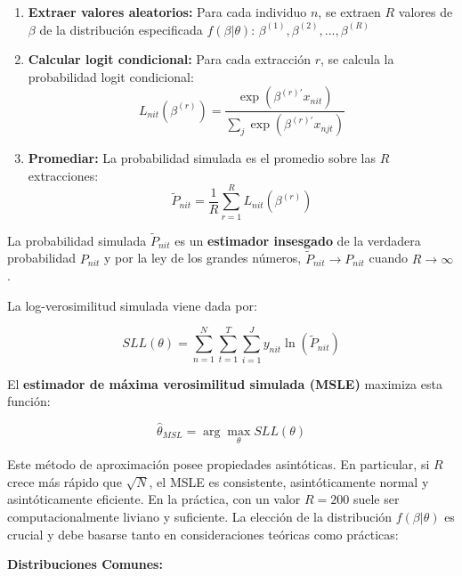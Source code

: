 \documentclass[
]{book}
\begin{document}
\begin{enumerate}
\def\labelenumi{\arabic{enumi}.}
\item
  \textbf{Extraer valores aleatorios:} Para cada individuo \(n\), se extraen \(R\) valores de \(\beta\) de la distribución especificada \(f(\beta|\theta)\): \(\beta^{(1)}, \beta^{(2)}, ..., \beta^{(R)}\)
\item
  \textbf{Calcular logit condicional:} Para cada extracción \(r\), se calcula la probabilidad logit condicional:
  \[L_{nit}(\beta^{(r)}) = \frac{\exp(\beta^{(r)'} x_{nit})}{\sum_j \exp(\beta^{(r)'} x_{njt})}\]
\item
  \textbf{Promediar:} La probabilidad simulada es el promedio sobre las \(R\) extracciones:
  \begin{equation}
  \tilde{P}_{nit} = \frac{1}{R} \sum_{r=1}^R L_{nit}(\beta^{(r)})
  \label{eq:simprob}
  \end{equation}
\end{enumerate}

La probabilidad simulada \(\tilde{P}_{nit}\) es un \textbf{estimador insesgado} de la verdadera probabilidad \(P_{nit}\) y por la ley de los grandes números, \(\tilde{P}_{nit} \to P_{nit}\) cuando \(R \to \infty\).

La log-verosimilitud simulada viene dada por:

\begin{equation}
SLL(\theta) = \sum_{n=1}^N \sum_{t=1}^T \sum_{i=1}^J y_{nit} \ln(\tilde{P}_{nit})
\label{eq:simll}
\end{equation}

El \textbf{estimador de máxima verosimilitud simulada (MSLE)} maximiza esta función:

\[\hat{\theta}_{MSL} = \arg\max_\theta SLL(\theta)\]

Este método de aproximación posee propiedades asintóticas. En particular, si \(R\) crece más rápido que \(\sqrt{N}\), el MSLE es consistente, asintóticamente normal y asintóticamente eficiente. En la práctica, con un valor \(R = 200\) suele ser computacionalmente liviano y suficiente. La elección de la distribución \(f(\beta|\theta)\) es crucial y debe basarse tanto en consideraciones teóricas como prácticas:

\textbf{Distribuciones Comunes:}
\end{document}
